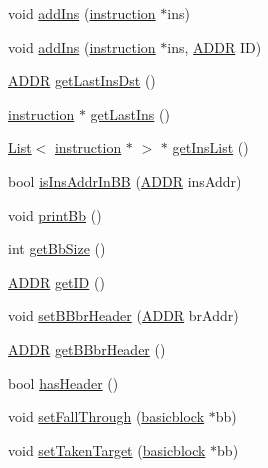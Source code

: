 \begin{DoxyCompactItemize}
\item 
void \hyperlink{classbasicblock_a17a204547c41f4ba744ac49b1f375477}{addIns} (\hyperlink{classinstruction}{instruction} $\ast$ins)
\item 
void \hyperlink{classbasicblock_a881f41cc184c5aafa1e0881bb67f6868}{addIns} (\hyperlink{classinstruction}{instruction} $\ast$ins, \hyperlink{binaryTranslator_2global_8h_aa4557b0650cb21e57e3e4623410832c6}{ADDR} ID)
\item 
\hyperlink{binaryTranslator_2global_8h_aa4557b0650cb21e57e3e4623410832c6}{ADDR} \hyperlink{classbasicblock_a5c04fc7ec170aa4d395928b7c4ca0392}{getLastInsDst} ()
\item 
\hyperlink{classinstruction}{instruction} $\ast$ \hyperlink{classbasicblock_a99fb16d14456bb07b0033a0489ced872}{getLastIns} ()
\item 
\hyperlink{classList}{List}$<$ \hyperlink{classinstruction}{instruction} $\ast$ $>$ $\ast$ \hyperlink{classbasicblock_adc40d816c82feedc1f7027fc29470d90}{getInsList} ()
\item 
bool \hyperlink{classbasicblock_afd299af5d08655c4fbd10221f5edb556}{isInsAddrInBB} (\hyperlink{binaryTranslator_2global_8h_aa4557b0650cb21e57e3e4623410832c6}{ADDR} insAddr)
\item 
void \hyperlink{classbasicblock_a1599003c14b63f443c1ca3c48c34238e}{printBb} ()
\item 
int \hyperlink{classbasicblock_a42862e82af55ea72dc2e69ad32f3df29}{getBbSize} ()
\item 
\hyperlink{binaryTranslator_2global_8h_aa4557b0650cb21e57e3e4623410832c6}{ADDR} \hyperlink{classbasicblock_aff434c369968fe5fb3151d8ec00665b4}{getID} ()
\item 
void \hyperlink{classbasicblock_a08a435779d5c69e560f81d76511033f8}{setBBbrHeader} (\hyperlink{binaryTranslator_2global_8h_aa4557b0650cb21e57e3e4623410832c6}{ADDR} brAddr)
\item 
\hyperlink{binaryTranslator_2global_8h_aa4557b0650cb21e57e3e4623410832c6}{ADDR} \hyperlink{classbasicblock_aba106088c0783baf1a57018bbc091fe1}{getBBbrHeader} ()
\item 
bool \hyperlink{classbasicblock_af49545fcc35042634fa48f78ca9f55cb}{hasHeader} ()
\item 
void \hyperlink{classbasicblock_ad97dd41248a01abbf1baa313845ff526}{setFallThrough} (\hyperlink{classbasicblock}{basicblock} $\ast$bb)
\item 
void \hyperlink{classbasicblock_af0d0269f9c9a3b52062170c667f436b2}{setTakenTarget} (\hyperlink{classbasicblock}{basicblock} $\ast$bb)

\end{DoxyCompactItemize}
